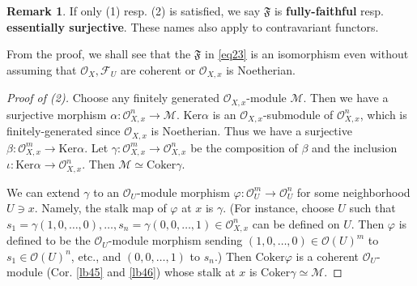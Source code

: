 \documentclass[12pt,b5paper,notitlepage]{report}
\theoremstyle{definition}
\newtheorem{rem}[df]{Remark}
\theoremstyle{plain}
\newcommand{\fk}{\mathfrak}
\newcommand{\mc}{\mathcal}
\newcommand{\scr}{\mathscr}
\newcommand{\Ker}{\mathrm{Ker}}
\newcommand{\Cok}{\mathrm{Coker}}
\numberwithin{equation}{section}
\begin{document}
\begin{rem}
If only (1) resp. (2) is satisfied, we say $\fk F$ is \textbf{fully-faithful} resp. \textbf{essentially surjective}.    These names also apply to contravariant functors.
\end{rem}

From the proof, we shall see that the $\fk F$ in \eqref{eq23} is an isomorphism even without assuming that $\scr O_X,\scr F_U$ are coherent or $\scr O_{X,x}$ is Noetherian. 


\begin{proof}[Proof of (2)]
Choose any finitely generated $\scr O_{X,x}$-module $\mc M$. Then we have a surjective morphism $\alpha:\scr O_{X,x}^n\rightarrow\mc M$. $\Ker\alpha$ is an $\scr O_{X,x}$-submodule of $\scr O_{X,x}^n$, which is finitely-generated since $\scr O_{X,x}$ is Noetherian. Thus we have a surjective $\beta:\scr O_{X,x}^m\rightarrow\Ker\alpha$. Let $\gamma:\scr O_{X,x}^m\rightarrow\scr O_{X,x}^n$ be the composition of $\beta$ and the inclusion $\iota:\Ker\alpha\rightarrow\scr O_{X,x}^n$. Then $\mc M\simeq\Cok\gamma$.

We can extend $\gamma$ to an $\scr O_U$-module morphism $\varphi:\scr O_U^m\rightarrow\scr O_U^n$ for some neighborhood $U\ni x$. Namely, the stalk map of $\varphi$ at $x$ is $\gamma$. (For instance, choose $U$ such that $s_1=\gamma(1,0,\dots,0),\dots,s_n=\gamma(0,0,\dots,1)\in\scr O_{X,x}^n$ can be defined on $U$. Then $\varphi$ is defined to be the $\scr O_U$-module morphism sending $(1,0,\dots,0)\in\scr O(U)^m$ to $s_1\in\scr O(U)^n$, etc., and $(0,0,\dots,1)$ to $s_n$.) Then $\Cok\varphi$ is a coherent $\scr O_U$-module (Cor. \ref{lb45} and \ref{lb46}) whose stalk at $x$ is $\Cok\gamma\simeq\mc M$.
\end{proof}
\end{document}
